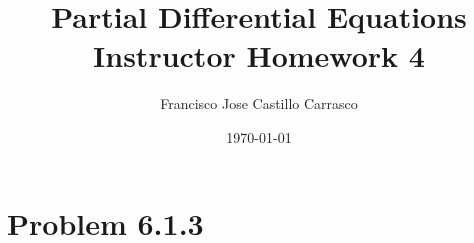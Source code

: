 




\title{Partial Differential Equations\\Instructor Homework 4}
\author{Francisco Jose Castillo Carrasco}
\date{\today}
\maketitle




\section*{Problem 6.1.3}


